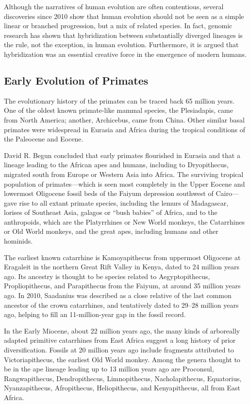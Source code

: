 Although the narratives of human evolution are often contentious, several discoveries since 2010 show that human evolution should not be seen as a simple linear or branched progression, but a mix of related species. In fact, genomic research has shown that hybridization between substantially diverged lineages is the rule, not the exception, in human evolution. Furthermore, it is argued that hybridization was an essential creative force in the emergence of modern humans.

\hypertarget{early-evolution-of-primates}{%
\subsection{Early Evolution of Primates}\label{early-evolution-of-primates}}

The evolutionary history of the primates can be traced back 65 million years. One of the oldest known primate-like mammal species, the Plesiadapis, came from North America; another, Archicebus, came from China. Other similar basal primates were widespread in Eurasia and Africa during the tropical conditions of the Paleocene and Eocene.

David R. Begun concluded that early primates flourished in Eurasia and that a lineage leading to the African apes and humans, including to Dryopithecus, migrated south from Europe or Western Asia into Africa. The surviving tropical population of primates---which is seen most completely in the Upper Eocene and lowermost Oligocene fossil beds of the Faiyum depression southwest of Cairo---gave rise to all extant primate species, including the lemurs of Madagascar, lorises of Southeast Asia, galagos or ``bush babies'' of Africa, and to the anthropoids, which are the Platyrrhines or New World monkeys, the Catarrhines or Old World monkeys, and the great apes, including humans and other hominids.

The earliest known catarrhine is Kamoyapithecus from uppermost Oligocene at Eragaleit in the northern Great Rift Valley in Kenya, dated to 24 million years ago. Its ancestry is thought to be species related to Aegyptopithecus, Propliopithecus, and Parapithecus from the Faiyum, at around 35 million years ago. In 2010, Saadanius was described as a close relative of the last common ancestor of the crown catarrhines, and tentatively dated to 29--28 million years ago, helping to fill an 11-million-year gap in the fossil record.

In the Early Miocene, about 22 million years ago, the many kinds of arboreally adapted primitive catarrhines from East Africa suggest a long history of prior diversification. Fossils at 20 million years ago include fragments attributed to Victoriapithecus, the earliest Old World monkey. Among the genera thought to be in the ape lineage leading up to 13 million years ago are Proconsul, Rangwapithecus, Dendropithecus, Limnopithecus, Nacholapithecus, Equatorius, Nyanzapithecus, Afropithecus, Heliopithecus, and Kenyapithecus, all from East Africa.

